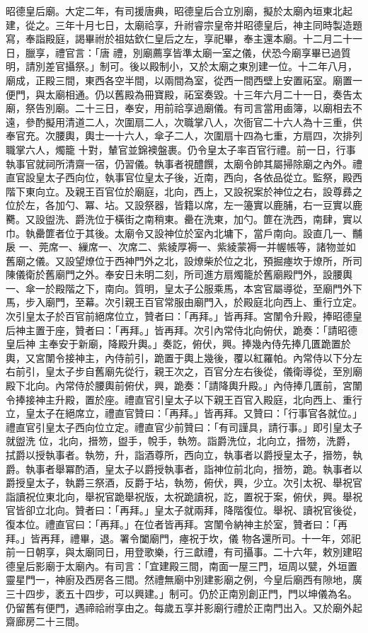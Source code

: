 \begin{pinyinscope}
 昭德皇后廟。大定二年，有司援唐典，昭德皇后合立別廟，擬於太廟內垣東北起建，從之。三年十月七日，太廟祫享，升祔睿宗皇帝并昭德皇后，神主同時製造題寫，奉詣殿庭，謁畢祔於祖姑欽仁皇后之左，享祀畢，奉主還本廟。十二月二十一日，臘享，禮官言：「唐
 禮，別廟薦享皆準太廟一室之儀，伏恐今廟享畢已過質明，請別差官攝祭。」制可。後以殿制小，又於太廟之東別建一位。十二年八月，廟成，正殿三間，東西各空半間，以兩間為室，從西一間西壁上安置祏室。廟置一便門，與太廟相通。仍以舊殿為冊寶殿，祏室奏毀。十三年六月二十一日，奏告太廟，祭告別廟。二十三日，奉安，用前祫享過廟儀。有司言當用鹵簿，以廟相去不遠，參酌擬用清道二人，次圍扇二人，次職掌八人，次衙官二十六人為十三重，供奉官充。次腰輿，輿士一十六人，傘子二人，次圍扇十四為七重，方扇四，次排列職掌六人，燭籠
 十對，輦官並錦襖盤裹。仍令皇太子率百官行禮。前一日，行事執事官就祠所清齋一宿，仍習儀。執事者視醴饌，太廟令帥其屬掃除廟之內外。禮直官設皇太子西向位，執事官位皇太子後，近南，西向，各依品從立。監祭，殿西階下東向立。及親王百官位於廟庭，北向，西上，又設祝案於神位之右，設尊彞之位於左，各加勺、冪、坫。又設祭器，皆籍以席，左一籩實以鹿脯，右一豆實以鹿臡。又設盥洗、爵洗位于橫街之南稍東。罍在洗東，加勺。篚在洗西，南肆，實以巾。執罍篚者位于其後。太廟令又設神位於室內北墉下，當戶南向。設直几一、黼扆
 一、莞席一、繅席一、次席二、紫綾厚褥一、紫綾蒙褥一并幄帳等，諸物並如舊廟之儀。又設望燎位于西神門外之北，設燎柴於位之北，預掘瘞坎于燎所，所司陳儀衛於舊廟門之外。奉安日未明二刻，所司進方扇燭籠於舊廟殿門外，設腰輿一、傘一於殿階之下，南向。質明，皇太子公服乘馬，本宮官屬導從，至廟門外下馬，步入廟門，至幕。次引親王百官常服由廟門入，於殿庭北向西上、重行立定。次引皇太子於百官前絕席位立，贊者曰：「再拜。」皆再拜。宮闈令升殿，捧昭德皇后神主置于座，贊者曰：「再拜。」皆再拜。次引內常侍北向俯伏，跪奏：「請昭德皇后神
 主奉安于新廟，降殿升輿。」奏訖，俯伏，興。捧幾內侍先捧几匱跪置於輿，又宮闈令接神主，內侍前引，跪置于輿上幾後，覆以紅羅帕。內常侍以下分左右前引，皇太子步自舊廟先從行，親王次之，百官分左右後從，儀衛導從，至別廟殿下北向。內常侍於腰輿前俯伏，興，跪奏：「請降輿升殿。」內侍捧几匱前，宮闈令捧接神主升殿，置於座。禮直官引皇太子以下親王百官入殿庭，北向西上、重行立，皇太子在絕席立，禮直官贊曰：「再拜。」皆再拜。又贊曰：「行事官各就位。」禮直官引皇太子西向位立定。禮直官少前贊曰：「有司謹具，請行事。」即引皇太子就盥洗
 位，北向，搢笏，盥手，帨手，執笏。詣爵洗位，北向立，搢笏，洗爵，拭爵以授執事者。執笏，升，詣酒尊所，西向立，執事者以爵授皇太子，搢笏，執爵。執事者舉冪酌酒，皇太子以爵授執事者，詣神位前北向，搢笏，跪。執事者以爵授皇太子，執爵三祭酒，反爵于坫，執笏，俯伏，興，少立。次引太祝、舉祝官詣讀祝位東北向，舉祝官跪舉祝版，太祝跪讀祝，訖，置祝于案，俯伏，興。舉祝官皆卻立北向。贊者曰：「再拜。」皇太子就兩拜，降階復位。舉祝、讀祝官後從，復本位。禮直官曰：「再拜。」在位者皆再拜。宮闈令納神主於室，贊者曰：「再拜。」皆再拜，禮畢，退。署令闔廟門，瘞祝于坎，儀
 物各還所司。十一年，郊祀前一日朝享，與太廟同日，用登歌樂，行三獻禮，有司攝事。二十六年，敕別建昭德皇后影廟于太廟內。有司言：「宜建殿三間，南面一屋三門，垣周以甓，外垣置靈星門一，神廚及西房各三間。然禮無廟中別建影廟之例，今皇后廟西有隙地，廣三十四步，袤五十四步，可以興建。」制可。仍於正南別創正門，門以坤儀為名。仍留舊有便門，遇禘祫祔享由之。每歲五享并影廟行禮於正南門出入。又於廟外起齋廊房二十三間。




\end{pinyinscope}
